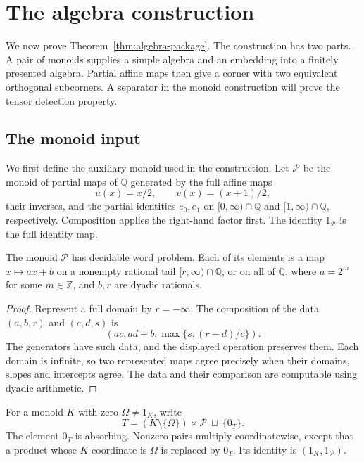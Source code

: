\section{The algebra construction}\label{sec:algebra}

We now prove Theorem~\ref{thm:algebra-package}.  The construction has two
parts.  A pair of monoids supplies a simple algebra and an embedding into
a finitely presented algebra.  Partial affine maps then give a corner
with two equivalent orthogonal subcorners.  A separator in the
monoid construction will prove the tensor detection property.

\subsection{The monoid input}

We first define the auxiliary monoid used in the construction.  Let
\(\mathcal P\) be the monoid of partial maps of \(\mathbb Q\) generated by
the full affine maps
\[
 u(x)=x/2,\qquad v(x)=(x+1)/2,
\]
their inverses, and the partial identities \(e_0,e_1\) on
\([0,\infty)\cap\mathbb Q\) and \([1,\infty)\cap\mathbb Q\), respectively.
Composition applies the right-hand factor first.  The identity
\(1_{\mathcal P}\) is the full identity map.

\begin{lemma}\label{lem:partial-affine}
The monoid \(\mathcal P\) has decidable word problem.  Each of its elements
is a map \(x\mapsto ax+b\) on a nonempty rational tail
\([r,\infty)\cap\mathbb Q\), or on all of \(\mathbb Q\), where
\(a=2^m\) for some \(m\in\mathbb Z\), and \(b,r\) are dyadic rationals.
\end{lemma}

\begin{proof}
Represent a full domain by \(r=-\infty\).  The composition of the data
\((a,b,r)\) and \((c,d,s)\) is
\[
 \left(ac,ad+b,\max\{s,(r-d)/c\}\right).
\]
The generators have such data, and the displayed operation preserves
them.  Each domain is infinite, so two represented maps agree precisely
when their domains, slopes and intercepts agree.  The data and their
comparison are computable using dyadic arithmetic.
\end{proof}

For a monoid \(K\) with zero \(\Omega\ne1_K\), write
\[
 T=(K\setminus\{\Omega\})\times\mathcal P\ \sqcup\ \{0_T\}.
\]
The element \(0_T\) is absorbing.  Nonzero pairs multiply
coordinatewise, except that a product whose \(K\)-coordinate is
\(\Omega\) is replaced by \(0_T\).  Its identity is
\((1_K,1_{\mathcal P})\).

